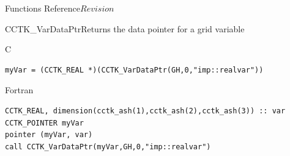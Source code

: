 \begin{cactuspart}{ Functions Reference}{}{$Revision$}
\begin{FunctionDescription}{CCTK\_VarDataPtr}{Returns the data pointer for a grid variable}
\begin{ErrorSection}
\begin{Error}{}
\end{Error}
\end{ErrorSection}
\begin{ExampleSection}
\begin{Example}{C}
\begin{verbatim}
myVar = (CCTK_REAL *)(CCTK_VarDataPtr(GH,0,"imp::realvar"))
\end{verbatim}
\end{Example}
\begin{Example}{Fortran}
\begin{verbatim}
CCTK_REAL, dimension(cctk_ash(1),cctk_ash(2),cctk_ash(3)) :: var
CCTK_POINTER myVar
pointer (myVar, var)
call CCTK_VarDataPtr(myVar,GH,0,"imp::realvar")
\end{verbatim}
\end{Example}
\end{ExampleSection}
\end{FunctionDescription}


\end{cactuspart}
